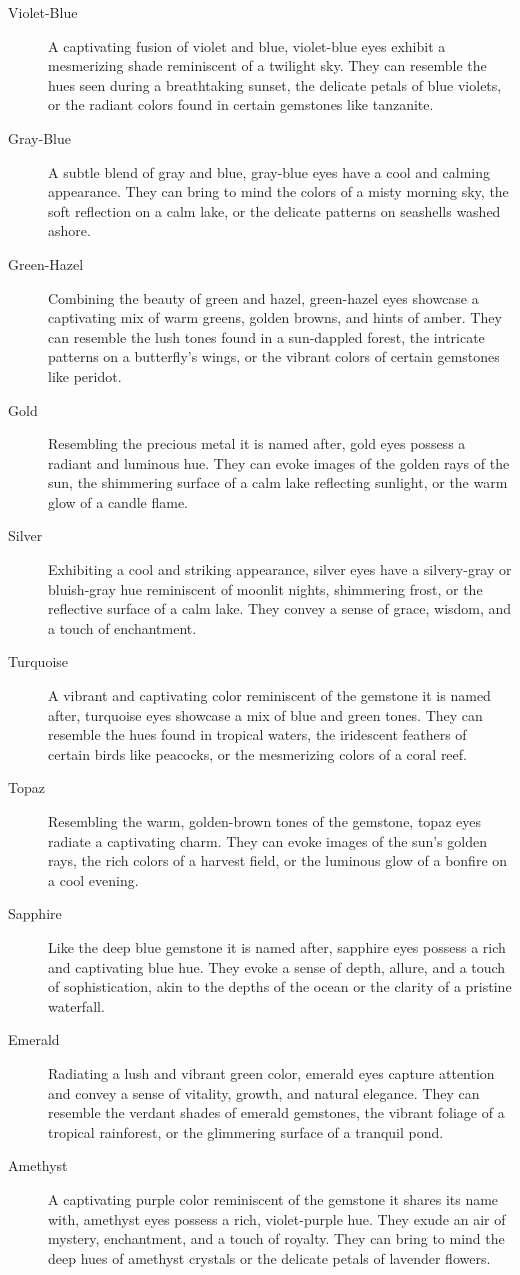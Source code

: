 \documentclass[12pt]{book}
\begin{document}
\begin{description}
    \item[Violet-Blue] A captivating fusion of violet and blue, violet-blue eyes exhibit a mesmerizing shade reminiscent of a twilight sky. They can resemble the hues seen during a breathtaking sunset, the delicate petals of blue violets, or the radiant colors found in certain gemstones like tanzanite.
    \item[Gray-Blue] A subtle blend of gray and blue, gray-blue eyes have a cool and calming appearance. They can bring to mind the colors of a misty morning sky, the soft reflection on a calm lake, or the delicate patterns on seashells washed ashore.
    \item[Green-Hazel] Combining the beauty of green and hazel, green-hazel eyes showcase a captivating mix of warm greens, golden browns, and hints of amber. They can resemble the lush tones found in a sun-dappled forest, the intricate patterns on a butterfly's wings, or the vibrant colors of certain gemstones like peridot.
    \item[Gold] Resembling the precious metal it is named after, gold eyes possess a radiant and luminous hue. They can evoke images of the golden rays of the sun, the shimmering surface of a calm lake reflecting sunlight, or the warm glow of a candle flame.
    \item[Silver] Exhibiting a cool and striking appearance, silver eyes have a silvery-gray or bluish-gray hue reminiscent of moonlit nights, shimmering frost, or the reflective surface of a calm lake. They convey a sense of grace, wisdom, and a touch of enchantment.
    \item[Turquoise] A vibrant and captivating color reminiscent of the gemstone it is named after, turquoise eyes showcase a mix of blue and green tones. They can resemble the hues found in tropical waters, the iridescent feathers of certain birds like peacocks, or the mesmerizing colors of a coral reef.
    \item[Topaz] Resembling the warm, golden-brown tones of the gemstone, topaz eyes radiate a captivating charm. They can evoke images of the sun's golden rays, the rich colors of a harvest field, or the luminous glow of a bonfire on a cool evening.
    \item[Sapphire] Like the deep blue gemstone it is named after, sapphire eyes possess a rich and captivating blue hue. They evoke a sense of depth, allure, and a touch of sophistication, akin to the depths of the ocean or the clarity of a pristine waterfall.
    \item[Emerald] Radiating a lush and vibrant green color, emerald eyes capture attention and convey a sense of vitality, growth, and natural elegance. They can resemble the verdant shades of emerald gemstones, the vibrant foliage of a tropical rainforest, or the glimmering surface of a tranquil pond.
    \item[Amethyst] A captivating purple color reminiscent of the gemstone it shares its name with, amethyst eyes possess a rich, violet-purple hue. They exude an air of mystery, enchantment, and a touch of royalty. They can bring to mind the deep hues of amethyst crystals or the delicate petals of lavender flowers.
\end{description}
\end{document}
